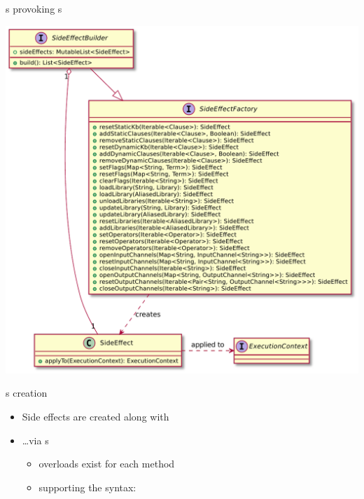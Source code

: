 \documentclass[handout]{beamer}
\begin{document}
\begin{frame}[allowframebreaks]{s provoking s}
    \begin{center}
        \includegraphics[height=.75\textheight]{img/sideeffects.pdf}
    \end{center}

    \begin{block}{s creation}
        \begin{itemize}
            \item Side effects are created along with 
            \item \ldots via \alert{s}
            \begin{itemize}
                \item overloads exist for each  method
                \item supporting the syntax:
                \begin{center}
                \end{center}
            \end{itemize}
        \end{itemize}
    \end{block}

    \framebreak


\end{frame}
\end{document}
